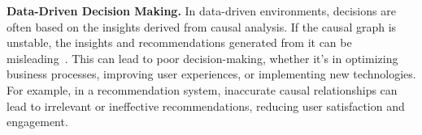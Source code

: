\documentclass[]{svjour3}
\begin{document}
  \textbf{Data-Driven Decision Making.} In data-driven environments, decisions are often based on the insights derived from causal analysis. If the causal graph is unstable, the insights and recommendations generated from it can be misleading~\cite{10.1145/3636423}. This can lead to poor decision-making, whether it's in optimizing business processes, improving user experiences, or implementing new technologies. For example, in a recommendation system, inaccurate causal relationships can lead to irrelevant or ineffective recommendations, reducing user satisfaction and engagement.









\end{document}
